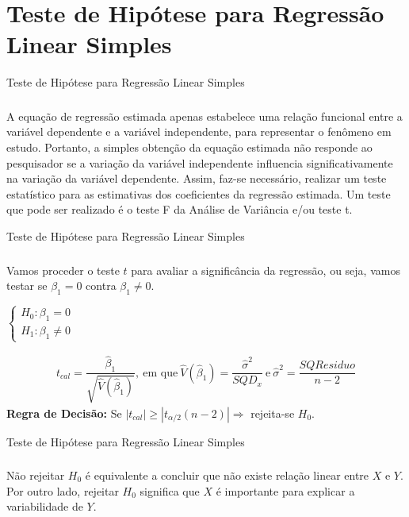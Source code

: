 \documentclass[14pt,aspectratio=1610]{beamer}
\begin{document}
\section{Teste de Hipótese para Regressão Linear Simples}
\begin{frame}{Teste de Hipótese para Regressão Linear Simples}
\frametitle{}
\begin{block}{}
\justifying
A equação de regressão estimada apenas estabelece uma relação funcional entre a variável dependente e a variável independente, para representar o fenômeno em estudo. Portanto, a simples obtenção da equação estimada não responde ao pesquisador se a variação da variável independente in\-fluen\-cia significativamente na variação da variável dependente. Assim, faz-se necessário, realizar um teste estatístico para as estimativas dos coeficientes da regressão estimada. Um teste que pode ser realizado é o teste F da Análise de Variância e/ou teste t.

\end{block}
\end{frame}

\begin{frame}{Teste de Hipótese para Regressão Linear Simples}
\frametitle{}
\begin{block}{}
\justifying
Vamos proceder o teste $t$ para avaliar a significância da regressão, ou seja, vamos testar se $\beta_{1}=0$ contra $\beta_{1}\neq 0.$
\newline

\begin{center}
$
\begin{cases}
       H_{0}:\beta_{1}=0\\ 
       H_{1}:\beta_{1}\neq 0
\end{cases}
$
\end{center}
\begin{align*}
t_{cal}=\dfrac{\hat{\beta}_{1}}{\sqrt{\hat{V}(\hat{\beta}_{1})}},~\textrm{em que}~\hat{V}(\hat{\beta}_{1})=\dfrac{\hat{\sigma}^{2}}{SQD_{x}}~\textrm{e}~\hat{\sigma}^{2}=\dfrac{SQResiduo}{n-2}
\end{align*}
\textbf{Regra de Decisão:} Se $|t_{cal}|\geq |t_{\alpha/2}(n-2)|\Rightarrow$ rejeita-se $H_{0}.$
\end{block}
\end{frame}

\begin{frame}{Teste de Hipótese para Regressão Linear Simples}
\frametitle{}
\begin{block}{}
\justifying
Não rejeitar $H_{0}$ é equivalente a concluir que não existe relação linear entre $X$ e $Y.$ Por outro lado, rejeitar $H_{0}$ significa que $X$ é importante para explicar a variabilidade de $Y.$
\end{block}
\end{frame}
\end{document}
